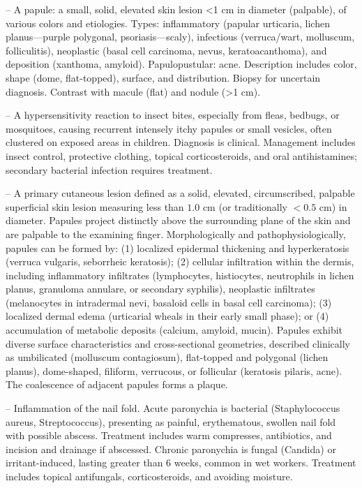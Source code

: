 -- A papule: a small, solid, elevated skin lesion <1 cm in diameter (palpable), of various colors and etiologies. Types: inflammatory (papular urticaria, lichen planus—purple polygonal, psoriasis—scaly), infectious (verruca/wart, molluscum, folliculitis), neoplastic (basal cell carcinoma, nevus, keratoacanthoma), and deposition (xanthoma, amyloid). Papulopustular: acne. Description includes color, shape (dome, flat-topped), surface, and distribution. Biopsy for uncertain diagnosis. Contrast with macule (flat) and nodule (>1 cm).

-- A hypersensitivity reaction to insect bites, especially from fleas, bedbugs, or mosquitoes, causing recurrent intensely itchy papules or small vesicles, often clustered on exposed areas in children. Diagnosis is clinical. Management includes insect control, protective clothing, topical corticosteroids, and oral antihistamines; secondary bacterial infection requires treatment.

-- A primary cutaneous lesion defined as a solid, elevated, circumscribed, palpable superficial skin lesion measuring less than $1.0\text{ cm}$ (or traditionally $<0.5\text{ cm}$) in diameter. Papules project distinctly above the surrounding plane of the skin and are palpable to the examining finger. Morphologically and pathophysiologically, papules can be formed by: (1) localized epidermal thickening and hyperkeratosis (verruca vulgaris, seborrheic keratosis); (2) cellular infiltration within the dermis, including inflammatory infiltrates (lymphocytes, histiocytes, neutrophils in lichen planus, granuloma annulare, or secondary syphilis), neoplastic infiltrates (melanocytes in intradermal nevi, basaloid cells in basal cell carcinoma); (3) localized dermal edema (urticarial wheals in their early small phase); or (4) accumulation of metabolic deposits (calcium, amyloid, mucin). Papules exhibit diverse surface characteristics and cross-sectional geometries, described clinically as umbilicated (molluscum contagiosum), flat-topped and polygonal (lichen planus), dome-shaped, filiform, verrucous, or follicular (keratosis pilaris, acne). The coalescence of adjacent papules forms a plaque.

-- Inflammation of the nail fold. Acute paronychia is bacterial (Staphylococcus aureus, Streptococcus), presenting as painful, erythematous, swollen nail fold with possible abscess. Treatment includes warm compresses, antibiotics, and incision and drainage if abscessed. Chronic paronychia is fungal (Candida) or irritant-induced, lasting greater than 6 weeks, common in wet workers. Treatment includes topical antifungals, corticosteroids, and avoiding moisture.

